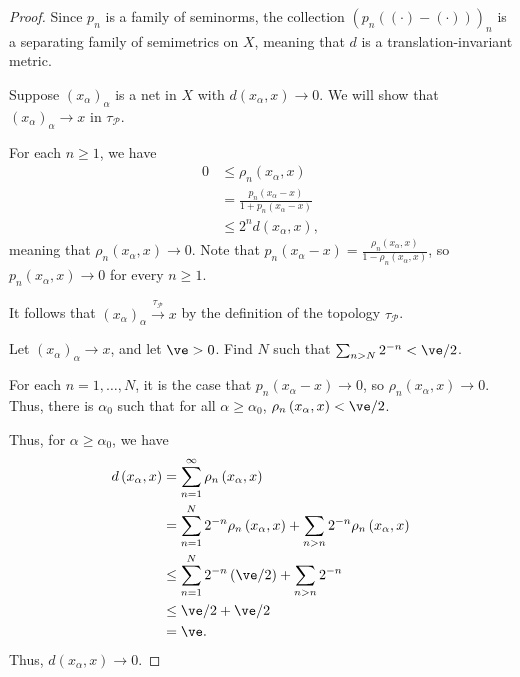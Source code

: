 \documentclass[10pt]{mypackage}
\begin{document}
\begin{proof}
  Since $p_n$ is a family of seminorms, the collection $\left(p_n\left((\cdot) - (\cdot)\right)\right)_n$ is a separating family of semimetrics on $X$, meaning that $d$ is a translation-invariant metric.\newline

  Suppose $\left(x_{\alpha}\right)_{\alpha}$ is a net in $X$ with $d\left(x_{\alpha},x\right)\rightarrow 0$. We will show that $\left(x_{\alpha}\right)_{\alpha}\rightarrow x$ in $\tau_{\mathcal{P}}$.\newline

  For each $n\geq 1$, we have
  \begin{align*}
    0 &\leq \rho_n\left(x_{\alpha},x\right)\\
      &= \frac{p_n\left(x_{\alpha} - x\right)}{1 + p_n\left(x_{\alpha} - x\right)}\\
      &\leq 2^n d\left(x_{\alpha},x\right),
  \end{align*}
  meaning that $\rho_{n}\left(x_{\alpha},x\right)\rightarrow 0$. Note that $p_n\left(x_{\alpha} - x\right) = \frac{\rho_{n}\left(x_{\alpha},x\right)}{1-\rho_{n}\left(x_{\alpha},x\right)}$, so $p_n\left(x_{\alpha},x\right)\rightarrow 0$ for every $n\geq 1$.\newline

  It follows that $\left(x_{\alpha}\right)_{\alpha}\xrightarrow{\tau_{\mathcal{P}}} x$ by the definition of the topology $\tau_{\mathcal{P}}$.\newline

  Let $\left(x_{\alpha}\right)_{\alpha}\rightarrow x$, and let $\ve > 0$. Find $N$ such that $\sum_{n > N}2^{-n} < \ve/2$.\newline

  For each $n = 1,\dots,N$, it is the case that $p_n\left(x_{\alpha}-x\right)\rightarrow 0$, so $\rho_{n}\left(x_{\alpha},x\right)\rightarrow 0$. Thus, there is $\alpha_0$ such that for all $\alpha \geq \alpha_0$, $\rho_{n}\left(x_{\alpha},x\right) < \ve/2$.\newline
  
  Thus, for $\alpha \geq \alpha_0$, we have
  \begin{align*}
    d\left(x_{\alpha},x\right) &= \sum_{n=1}^{\infty}\rho_{n}\left(x_{\alpha},x\right)\\
                               &= \sum_{n=1}^{N}2^{-n}\rho_{n}\left(x_{\alpha},x\right) + \sum_{n > n}2^{-n}\rho_{n}\left(x_{\alpha},x\right)\\
                               &\leq \sum_{n=1}^{N}2^{-n}\left(\ve/2\right) + \sum_{n > n}2^{-n}\\
                               &\leq \ve/2 + \ve/2\\
                               &= \ve.
  \end{align*}
  Thus, $d\left(x_{\alpha},x\right)\rightarrow 0$.
\end{proof}
\end{document}
